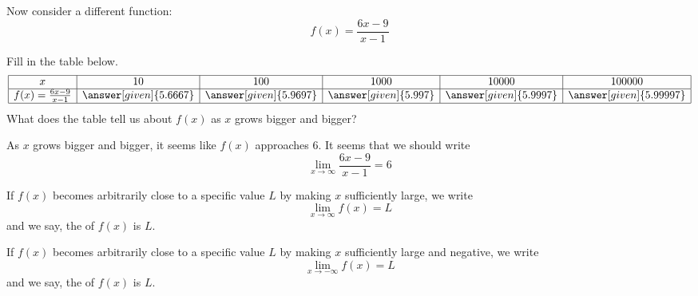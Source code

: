 \documentclass{ximera}
\begin{document}
\begin{example}
  Now consider a different function:
  \[
  f(x) = \frac{6x-9}{x-1}
  \]
  \begin{image}
  \end{image}
  Fill in the table below.
  \[
  \begin{array}{|c|c|c|c|c|c|}
    \hline
  x & 10 & 100 & 1000 &10000 & 100000 \\\hline
  f(x)=\frac{6x-9}{x-1} & \answer[given]{5.6667} & \answer[given]{5.9697} & \answer[given]{5.997} & \answer[given]{5.9997} & \answer[given]{5.99997}  \\
\hline
\end{array}
  \]
  What does the table tell us about $f(x)$ as $x$ grows bigger and bigger?
  \begin{explanation}
    As $x$ grows bigger and bigger, it seems like $f(x)$ approaches $6$.
    It seems that we should write
    \[
    \lim_{x\to \infty}\frac{6x-9}{x-1}=6 
    \]
  \end{explanation}
\end{example}

\begin{definition}\label{def:limitAtInfty}
If $f(x)$ becomes arbitrarily close to a specific value $L$ by making
$x$ sufficiently large, we write
\[
\lim_{x\to \infty} f(x) = L
\]
and we say, the  of $f(x)$ is $L$.  

If $f(x)$ becomes arbitrarily close to a specific value $L$ by making
$x$ sufficiently large and negative, we write
\[
\lim_{x\to -\infty} f(x) = L
\]
and we say, the  of $f(x)$ is $L$.  
\end{definition}
\end{document}
